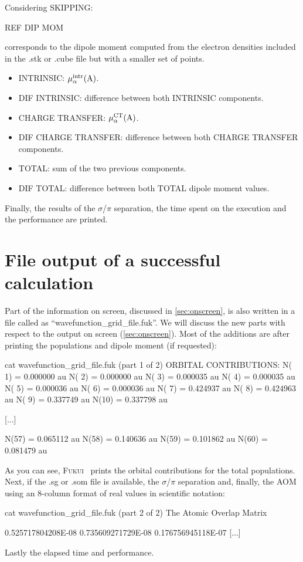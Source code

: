 \documentclass[a4paper,11pt,openany]{memoir}
\newcommand\programa{\textsc{Fukui}}
\begin{document}
\begin{labeling}{Considering SKIPPING:}
\begin{labeling}{REF DIP MOM}
				\item 	[REF DIP MOM]	corresponds to the dipole moment computed from the electron densities included in the .stk or .cube file but with a smaller set of points.
						\begin{itemize}
							\item 	INTRINSIC:				$\mu_{\alpha}^{\text{intr}}(\ce{A})$.
							\item 	DIF INTRINSIC:			difference between both INTRINSIC components.
							\item 	CHARGE TRANSFER:		$\mu_{\alpha}^{\text{CT}}(\ce{A})$.
							\item 	DIF CHARGE TRANSFER:	difference between both CHARGE TRANSFER components.
							\item 	TOTAL:					sum of the two previous components.
							\item 	DIF TOTAL:				difference between both TOTAL dipole moment values.
						\end{itemize}
			\end{labeling}
\end{labeling}

Finally, the results of the $\sigma$/$\pi$ separation, the time spent on the execution and the performance are printed.

\section{File output of a successful calculation}\label{sec:file}
Part of the information on screen, discussed in \autoref{sec:onscreen}, is also written in a file called as ``wavefunction\_grid\_file.fuk''. We will discuss the new parts with respect to the output on screen (\autoref{sec:onscreen}). Most of the additions are after printing the populations and dipole moment (if requested):
\begin{consola}{cat wavefunction\_grid\_file.fuk (part 1 of 2)}
    ORBITAL CONTRIBUTIONS:
     N( 1) =     0.000000 au
     N( 2) =     0.000000 au
     N( 3) =     0.000035 au
     N( 4) =     0.000035 au
     N( 5) =     0.000036 au
     N( 6) =     0.000036 au
     N( 7) =     0.424937 au
     N( 8) =     0.424963 au
     N( 9) =     0.337749 au
     N(10) =     0.337798 au

[...]

     N(57) =     0.065112 au
     N(58) =     0.140636 au
     N(59) =     0.101862 au
     N(60) =     0.081479 au
\end{consola}
As you can see, \programa~ prints the orbital contributions for the total populations. Next, if the .sg or .som file is available, the $\sigma$/$\pi$ separation and, finally, the \ac{AOM} using an 8-column format of real values in scientific notation:
\begin{consola}{cat wavefunction\_grid\_file.fuk (part 2 of 2)}
          The Atomic Overlap Matrix



   0.525717804208E-08
   0.735609271729E-08  0.176756945118E-07
[...]
\end{consola}
Lastly the elapsed time and performance.
\end{document}
